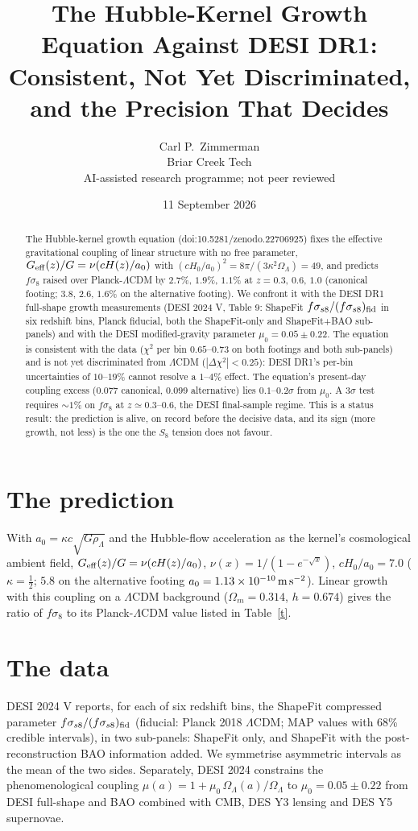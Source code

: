 \documentclass[11pt,letterpaper]{article}
\title{The Hubble-Kernel Growth Equation Against DESI DR1:\\ Consistent, Not Yet Discriminated, and the Precision That Decides}
\author{Carl P.\ Zimmerman\\ \small Briar Creek Tech\\ \small AI-assisted research programme; not peer reviewed}
\date{11 September 2026}
\begin{document}
\maketitle
\begin{abstract}
The Hubble-kernel growth equation (doi:10.5281/zenodo.22706925) fixes the effective gravitational coupling of linear structure with no free parameter, $G_{\rm eff}(z)/G=\nu(cH(z)/a_0)$ with $(cH_0/a_0)^2=8\pi/(3\kappa^2\Omega_\Lambda)=49$, and predicts $f\sigma_8$ raised over Planck-$\Lambda$CDM by $2.7\%$, $1.9\%$, $1.1\%$ at $z=0.3,\,0.6,\,1.0$ (canonical footing; $3.8$, $2.6$, $1.6\%$ on the alternative footing). We confront it with the DESI DR1 full-shape growth measurements (DESI 2024 V, Table 9: ShapeFit $f\sigma_{s8}/(f\sigma_{s8})_{\rm fid}$ in six redshift bins, Planck fiducial, both the ShapeFit-only and ShapeFit+BAO sub-panels) and with the DESI modified-gravity parameter $\mu_0=0.05\pm0.22$. The equation is consistent with the data ($\chi^2$ per bin $0.65$--$0.73$ on both footings and both sub-panels) and is not yet discriminated from $\Lambda$CDM ($|\Delta\chi^2|<0.25$): DESI DR1's per-bin uncertainties of $10$--$19\%$ cannot resolve a $1$--$4\%$ effect. The equation's present-day coupling excess ($0.077$ canonical, $0.099$ alternative) lies $0.1$--$0.2\sigma$ from $\mu_0$. A $3\sigma$ test requires $\sim1\%$ on $f\sigma_8$ at $z\simeq0.3$--$0.6$, the DESI final-sample regime. This is a status result: the prediction is alive, on record before the decisive data, and its sign (more growth, not less) is the one the $S_8$ tension does not favour.
\end{abstract}
\section{The prediction}
With $a_0=\kappa c\sqrt{G\rho_\Lambda}$ and the Hubble-flow acceleration as the kernel's cosmological ambient field, $G_{\rm eff}(z)/G=\nu(cH(z)/a_0)$, $\nu(x)=1/(1-e^{-\sqrt x})$, $cH_0/a_0=7.0$ ($\kappa=\tfrac12$; $5.8$ on the alternative footing $a_0=1.13\times10^{-10}\,{\rm m\,s^{-2}}$). Linear growth with this coupling on a $\Lambda$CDM background ($\Omega_m=0.314$, $h=0.674$) gives the ratio of $f\sigma_8$ to its Planck-$\Lambda$CDM value listed in Table~\ref{t}.
\section{The data}
DESI 2024 V \cite{desiv} reports, for each of six redshift bins, the ShapeFit compressed parameter $f\sigma_{s8}/(f\sigma_{s8})_{\rm fid}$ (fiducial: Planck 2018 $\Lambda$CDM; MAP values with 68\% credible intervals), in two sub-panels: ShapeFit only, and ShapeFit with the post-reconstruction BAO information added. We symmetrise asymmetric intervals as the mean of the two sides. Separately, DESI 2024 \cite{desimg} constrains the phenomenological coupling $\mu(a)=1+\mu_0\,\Omega_\Lambda(a)/\Omega_\Lambda$ to $\mu_0=0.05\pm0.22$ from DESI full-shape and BAO combined with CMB, DES Y3 lensing and DES Y5 supernovae.
\end{document}
